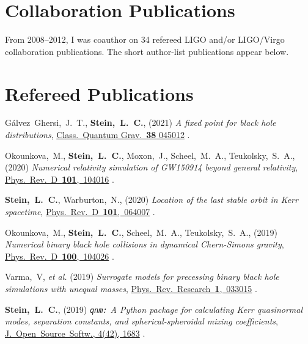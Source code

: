 \section{\sc Collaboration Publications}
From 2008--2012, I was coauthor on 34 refereed LIGO and/or LIGO/Virgo
collaboration publications. The short author-list publications appear
below.

\section{\sc Refereed Publications}
\addtocounter{pubCounter}{-1}
\begin{etaremune}[start=\value{pubCounter}]
\item
  Gálvez~Ghersi,~J.~T.,
  {\bf Stein,~L.~C.},
  (2021)
  {\it A fixed point for black hole distributions},
  \href{https://doi.org/10.1088/1361-6382/abcfd2}
  {Class.~Quantum Grav.~{\bf 38} 045012}
  .
\item
  Okounkova,~M.,
  {\bf Stein,~L.~C.},
  Moxon,~J.,
  Scheel,~M.~A.,
  Teukolsky,~S.~A.,
  (2020)
  {\it Numerical relativity simulation of GW150914 beyond general relativity},
  \href{https://doi.org/10.1103/PhysRevD.101.104016}{Phys.~Rev.~D~{\bf 101},~104016}
  .
\item
  {\bf Stein,~L.~C.},
  Warburton,~N.,
  (2020)
  {\it Location of the last stable orbit in Kerr spacetime},
  \href{https://doi.org/10.1103/PhysRevD.101.064007}{Phys.~Rev.~D~{\bf 101},~064007}
  .
\item
  Okounkova,~M.,
  {\bf Stein,~L.~C.},
  Scheel,~M.~A.,
  Teukolsky,~S.~A.,
  (2019)
  {\it Numerical binary black hole collisions in dynamical Chern-Simons gravity},
  \href{https://doi.org/10.1103/PhysRevD.100.104026}{Phys.~Rev.~D~{\bf 100},~104026}
  .
\item
  Varma,~V, {\it et al.}
  (2019)
  {\it Surrogate models for precessing binary black hole simulations with
  unequal masses},
  \href{https://doi.org/10.1103/PhysRevResearch.1.033015}{Phys.~Rev.~Research~{\bf 1},~033015}
  .
\item
  {\bf Stein,~L.~C.},
  (2019)
  \hspace{0.1em}
  {\it {\tt qnm:} A Python package for calculating Kerr quasinormal modes, separation constants, and spherical-spheroidal mixing coefficients},
  \href{https://doi.org/10.21105/joss.01683}{J.~Open~Source~Softw., 4(42), 1683}
  .

\end{etaremune}
